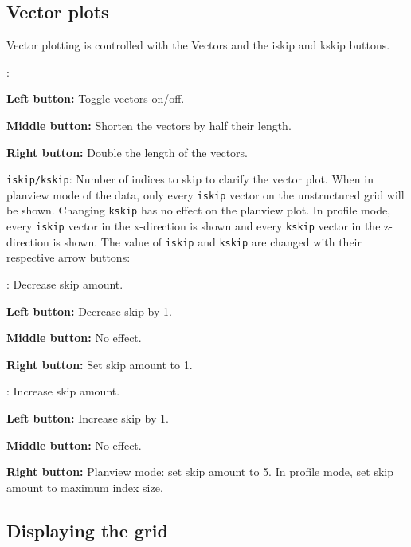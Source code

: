 \subsection{Vector plots}

Vector plotting is controlled with the Vectors and the iskip and kskip buttons.
\begin{list}{}
\item {}:
\begin{list}{}
\item {\bf Left button:} Toggle vectors on/off.
\item {\bf Middle button:} Shorten the vectors by half their length.
\item {\bf Right button:} Double the length of the vectors.
\end{list}
\begin{list}{}
\item \verb+iskip/kskip+: Number of indices to skip to clarify the vector plot.
When in planview mode of the data, only every \verb+iskip+ vector on the unstructured
grid will be shown. Changing \verb+kskip+ has no
effect on the planview plot.
In profile mode, every \verb+iskip+ vector in the x-direction is shown and 
every \verb+kskip+ vector in the z-direction is shown.  The value of \verb+iskip+
and \verb+kskip+ are changed with their respective arrow buttons:
\begin{list}{}
\item \button{$<$}: Decrease skip amount.
\begin{list}{}
\item {\bf Left button:} Decrease skip by 1.
\item {\bf Middle button:} No effect.
\item {\bf Right button:} Set skip amount to 1.
\end{list}
\item \button{$>$}: Increase skip amount.
\begin{list}{}
\item {\bf Left button:} Increase skip by 1.
\item {\bf Middle button:} No effect.
\item {\bf Right button:} Planview mode: set skip amount to 5.  In profile mode, set skip
amount to maximum index size.
\end{list}
\end{list}
\end{list}
\end{list}

\subsection{Displaying the grid}

